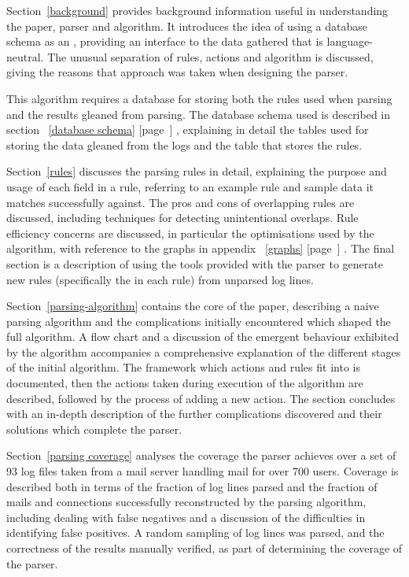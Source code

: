 \documentclass[a4paper,12pt,draft]{article}
\newcommand{\refwithpage}[1]{%
    \empty{}\ref{#1} [page~\pageref{#1}]%
}
\newcommand{\numberOFlogFILES}[0]{%
    93%
}
\begin{document}
Section~\ref{background} provides background information useful in
understanding the paper, parser and algorithm.  It introduces the idea of
using a database schema as an \API{}, providing an interface to the data
gathered that is language-neutral.  The unusual separation of rules,
actions and algorithm is discussed, giving the reasons that approach was
taken when designing the parser.

This algorithm requires a database for storing both the rules used when
parsing and the results gleaned from parsing.  The database schema used is
described in section~\refwithpage{database schema}, explaining in detail
the tables used for storing the data gleaned from the logs and the table
that stores the rules.

Section~\ref{rules} discusses the parsing rules in detail, explaining the
purpose and usage of each field in a rule, referring to an example rule and
sample data it matches successfully against.  The pros and cons of
overlapping rules are discussed, including techniques for detecting
unintentional overlaps.  Rule efficiency concerns are discussed, in
particular the optimisations used by the algorithm, with reference to the
graphs in appendix~\refwithpage{graphs}.  The final section is a
description of using the tools provided with the parser to generate new
rules (specifically the \regex{} in each rule) from unparsed log lines.

Section~\ref{parsing-algorithm} contains the core of the paper, describing
a naive parsing algorithm and the complications initially encountered which
shaped the full algorithm.  A flow chart and a discussion of the emergent
behaviour exhibited by the algorithm accompanies a comprehensive
explanation of the different stages of the initial algorithm.  The
framework which actions and rules fit into is documented, then the actions
taken during execution of the algorithm are described, followed by the
process of adding a new action.  The section concludes with an in-depth
description of the further complications discovered and their solutions
which complete the parser.

Section~\ref{parsing coverage} analyses the coverage the parser achieves
over a set of \numberOFlogFILES{} log files taken from a mail server
handling mail for over 700 users.  Coverage is described both in terms of
the fraction of log lines parsed and the fraction of mails and connections
successfully reconstructed by the parsing algorithm, including dealing with
false negatives and a discussion of the difficulties in identifying false
positives.  A random sampling of log lines was parsed, and the correctness
of the results manually verified, as part of determining the coverage of
the parser.
\end{document}
